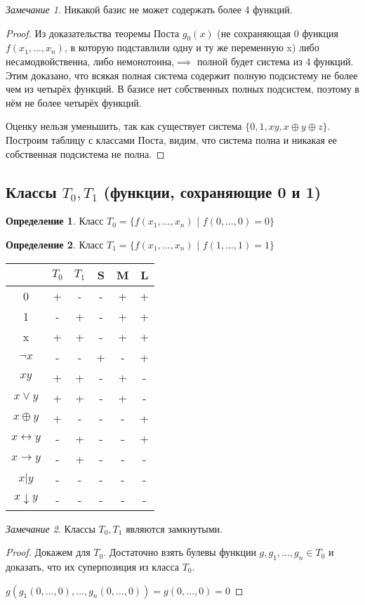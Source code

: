 \documentclass[a4paper]{article}
\theoremstyle{definition}
\newtheorem*{definition}{Определение}
\theoremstyle{remark}
\newtheorem*{remark}{Замечание}
\begin{document}
    \begin{remark}
        Никакой базис не может содержать более 4 функций.
    \end{remark}
    \begin{proof}
        Из доказательства теоремы Поста $g_0(x)$ (не сохраняющая 0 функция $f(x_1, \dots, x_n)$, 
        в которую подставлили одну и ту же переменную x) либо несамодвойственна, либо немонотонна,$\implies$
        полной будет система из 4 функций.
        Этим доказано, что всякая полная система содержит полную подсистему не более чем из четырёх функций. 
        В базисе нет собственных полных подсистем, поэтому в нём не более четырёх функций.
        
        Оценку нельзя уменьшить, так как существует система $\{0, 1, xy, x\oplus y \oplus z\}$.
        Построим таблицу с классами Поста, видим, что система полна и никакая ее собственная
        подсистема не полна.
    \end{proof}
    \subsection{Классы $T_0, T_1$ (функции, сохраняющие 0 и 1)}
    \begin{definition}
        Класс $T_0 = \{f(x_1,\dots, x_n)$ | $f(0, \dots, 0) = 0\}$
    \end{definition}
    \begin{definition}
        Класс $T_1 = \{f(x_1,\dots, x_n)$ | $f(1, \dots, 1) = 1\}$
    \end{definition}
    \begin{tabular}{c|c|c|c|c|c}
        & $T_0$ & $T_1$ & S & M & L\\
        \hline
        0 & + & - & - & + & +\\
        1 & - & + & - & + & + \\
        x & + & + & - & + & +\\
        $\neg x$ & - & - & +  & - & +\\
        $xy$ & + & + & - & + & -\\
        $x \vee y$ & + & + & - & + & -\\
        $x\oplus y$ & + & - & - & - & +\\
        $x\leftrightarrow y$ & - & + & - & - & +\\
        $x\rightarrow y$ & - & + & - & - & -\\
        $x|y$ & - & - & - & - & -\\
        $x\downarrow y$ & - & - & - & - & -\\
    \end{tabular}
    \begin{remark}
        Классы $T_0, T_1$ являются замкнутыми.
    \end{remark}
    \begin{proof}
        Докажем для $T_0$. Достаточно взять булевы функции $g, g_1, \dots, g_n\in T_0$
        и доказать, что их суперпозиция из класса $T_0.$

        $g(g_1 (0, \dots, 0), \dots, g_n(0, \dots, 0)) = g(0, \dots, 0) = 0$
    \end{proof}
\end{document}
